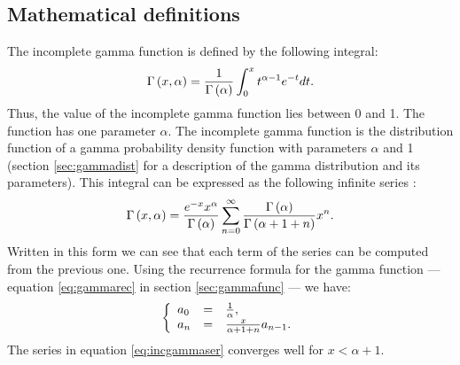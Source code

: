 \subsection{Mathematical definitions}
\label{sec:incgamma} The incomplete gamma function is defined by
the following integral:
\begin{equation}
  \Gamma\left(x,\alpha\right)={1\over\Gamma\left(\alpha\right)}
  \int_0^x t^{\alpha -1} e^{-t} dt.
\end{equation}
Thus, the value of the incomplete gamma function lies between 0
and 1. The function has one parameter $\alpha$. The incomplete
gamma function is the distribution function of a gamma probability
density function with parameters $\alpha$ and 1 (\cf section
\ref{sec:gammadist} for a description of the gamma distribution
and its parameters). This integral can be expressed as the
following infinite series \cite{AbrSteg}:
\begin{equation}
\label{eq:incgammaser}
  \Gamma\left(x,\alpha\right)={e^{-x}x^\alpha\over\Gamma\left(\alpha\right)}
  \sum_{n=0}^{\infty}{\Gamma\left(\alpha\right) \over
  \Gamma\left(\alpha+1+n\right)}x^n.
\end{equation}
Written in this form we can see that each term of the series can
be computed from the previous one. Using the recurrence formula
for the gamma function --- equation \ref{eq:gammarec} in section
\ref{sec:gammafunc} --- we have:
\begin{equation}
\label{eq:incgammaserterm}
  \left\{{
  \begin{array}{lcl}
    a_0 & = & {1\over\alpha},\\
    a_n & = & {x\over\alpha+1+n}a_{n-1}.
  \end{array}
  }\right.
\end{equation}
The series in equation \ref{eq:incgammaser} converges well for
$x<\alpha+1$.

